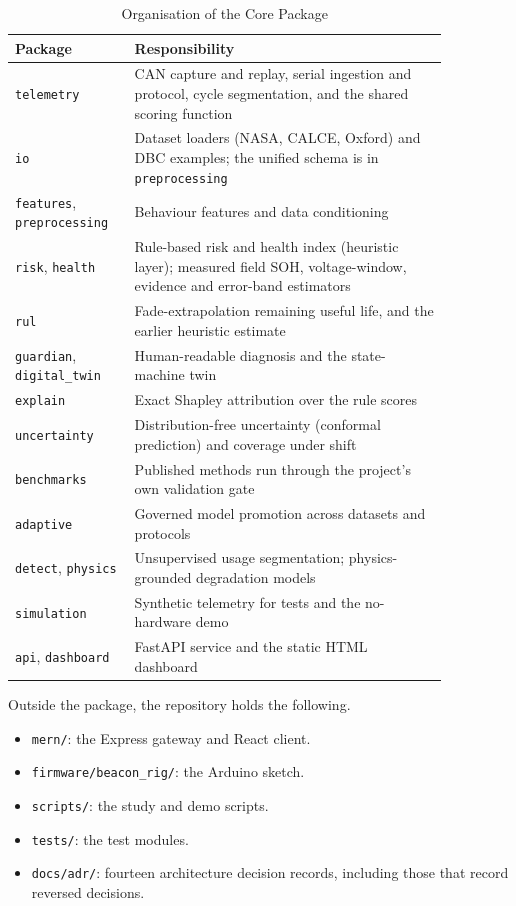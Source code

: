 \documentclass[12pt,a4paper]{amritareport}
\begin{document}
\begin{table}[htbp]
	\caption{Organisation of the Core Package}
	\centering
	\small
	\renewcommand{\arraystretch}{1.15}
	\setlength{\tabcolsep}{4pt}
	\begin{tabular}{|L{0.22\linewidth}|L{0.64\linewidth}|}
		\hline
		\textbf{Package} & \textbf{Responsibility} \\
		\hline
		\texttt{telemetry} & CAN capture and replay, serial ingestion and protocol, cycle segmentation, and the shared scoring function \\
		\hline
		\texttt{io} & Dataset loaders (NASA, CALCE, Oxford) and DBC examples; the unified schema is in \texttt{preprocessing} \\
		\hline
		\texttt{features}, \texttt{preprocessing} & Behaviour features and data conditioning \\
		\hline
		\texttt{risk}, \texttt{health} & Rule-based risk and health index (heuristic layer); measured field SOH, voltage-window, evidence and error-band estimators \\
		\hline
		\texttt{rul} & Fade-extrapolation remaining useful life, and the earlier heuristic estimate \\
		\hline
		\texttt{guardian}, \texttt{digital\_twin} & Human-readable diagnosis and the state-machine twin \\
		\hline
		\texttt{explain} & Exact Shapley attribution over the rule scores \\
		\hline
		\texttt{uncertainty} & Distribution-free uncertainty (conformal prediction) and coverage under shift \\
		\hline
		\texttt{benchmarks} & Published methods run through the project's own validation gate \\
		\hline
		\texttt{adaptive} & Governed model promotion across datasets and protocols \\
		\hline
		\texttt{detect}, \texttt{physics} & Unsupervised usage segmentation; physics-grounded degradation models \\
		\hline
		\texttt{simulation} & Synthetic telemetry for tests and the no-hardware demo \\
		\hline
		\texttt{api}, \texttt{dashboard} & FastAPI service and the static HTML dashboard \\
		\hline
	\end{tabular}
	\label{tab:packages}
\end{table}

Outside the package, the repository holds the following.
\begin{itemize}
	\item \texttt{mern/}: the Express gateway and React client.
	\item \texttt{firmware/beacon\_rig/}: the Arduino sketch.
	\item \texttt{scripts/}: the study and demo scripts.
	\item \texttt{tests/}: the test modules.
	\item \texttt{docs/adr/}: fourteen architecture decision records, including those that record reversed decisions.
\end{itemize}
\end{document}
